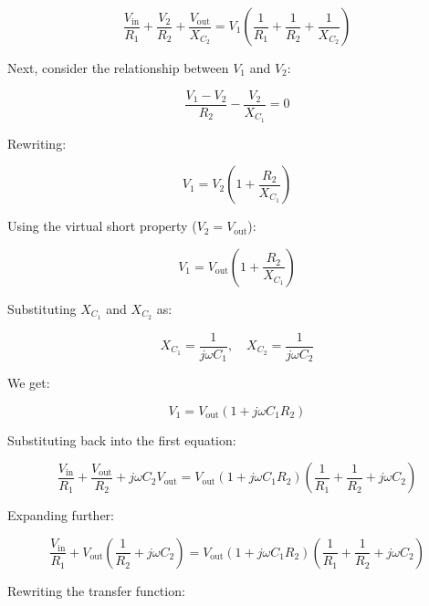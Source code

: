\documentclass[12pt]{article}
\begin{document}
\begin{equation}
\frac{V_{\text{in}}}{R_1} + \frac{V_2}{R_2} + \frac{V_{\text{out}}}{X_{C_2}} = V_1 \left( \frac{1}{R_1} + \frac{1}{R_2} + \frac{1}{X_{C_2}} \right)
\end{equation}

Next, consider the relationship between $V_1$ and $V_2$:

\begin{equation}
\frac{V_1 - V_2}{R_2} - \frac{V_2}{X_{C_1}} = 0
\end{equation}

Rewriting:

\begin{equation}
V_1 = V_2 \left( 1 + \frac{R_2}{X_{C_1}} \right)
\end{equation}

Using the virtual short property ($V_2 = V_{\text{out}}$):

\begin{equation}
V_1 = V_{\text{out}} \left( 1 + \frac{R_2}{X_{C_1}} \right)
\end{equation}

Substituting $X_{C_1}$ and $X_{C_2}$ as:

\begin{equation}
X_{C_1} = \frac{1}{j\omega C_1}, \quad X_{C_2} = \frac{1}{j\omega C_2}
\end{equation}

We get:

\begin{equation}
V_1 = V_{\text{out}} \left( 1 + j\omega C_1 R_2 \right)
\end{equation}

Substituting back into the first equation:

\begin{equation}
\frac{V_{\text{in}}}{R_1} + \frac{V_{\text{out}}}{R_2} + j\omega C_2 V_{\text{out}}= V_{\text{out}} ( 1 + j\omega C_1 R_2 ) \left( \frac{1}{R_1} + \frac{1}{R_2} + j\omega C_2 \right)
\end{equation}

Expanding further:

\begin{equation}
\frac{V_{\text{in}}}{R_1} + V_{\text{out}} \left( \frac{1}{R_2} + j\omega C_2 \right) = V_{\text{out}} \left( 1 + j\omega C_1 R_2 \right) \left( \frac{1}{R_1} + \frac{1}{R_2} + j\omega C_2 \right)
\end{equation}

Rewriting the transfer function:
\end{document}
